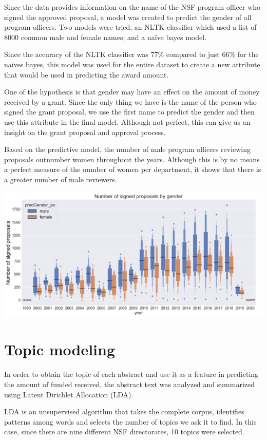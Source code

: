 \documentclass[11pt, oneside]{article}   	%
\begin{document}
Since the data provides information on the name of the NSF program officer who signed the approved proposal, a model was created to predict the gender of all program officers. Two models were tried, an NLTK classifier which used a list of 8000 common male and female names; and a naïve bayes model. 
 
Since the accuracy of the NLTK classifier was  77\% compared to just 66\% for the naïves bayes, this model was used for the entire dataset to create a new attribute that would be used in predicting the award amount.
 
One of the hypothesis is that gender may have an effect on the amount of money received by a grant. Since the only thing we have is the name of the person who signed the grant proposal, we use the first name to predict the gender and then use this attribute in the final model. Although not perfect, this can give us an insight on the grant proposal and approval process.
 
Based on the predictive model, the number of male program officers reviewing proposals outnumber women throughout the years. Although this is by no means a perfect measure of the number of women per department, it shows that there is a greater number of male reviewers. 

\includegraphics[width=\textwidth]{programofficergender}

 \section{{Topic modeling} }
 
In order to obtain the topic of each abstract and use it as a feature in predicting the amount of funded received, the abstract text was analyzed and summarized using Latent Dirichlet Allocation (LDA).
 
 LDA is an unsupervised algorithm that takes the complete corpus, identifies patterns among words and selects the number of topics we ask it to find. In this case, since there are nine different NSF directorates, 10 topics were selected.
 
\end{document}
